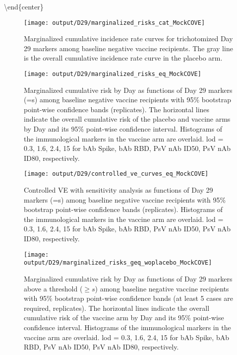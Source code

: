 \documentclass[
]{article}
\begin{document}
\textbackslash end\{center\}

\begin{figure}[H]
    \centering
    \texttt{[image: output/D29/marginalized\_risks\_cat\_MockCOVE]}
    \caption{Marginalized cumulative incidence rate curves for trichotomized Day 29 markers among baseline negative vaccine recipients. The gray line is the overall cumulative incidence rate curve in the placebo arm.}
\end{figure}

\begin{figure}[H]
    \centering
    \texttt{[image: output/D29/marginalized\_risks\_eq\_MockCOVE]}
    \caption{Marginalized cumulative risk by Day \protect as functions of Day 29 markers (=s) among baseline negative vaccine recipients with 95\% bootstrap point-wise confidence bands (\protect replicates). The horizontal lines indicate the overall cumulative risk of the placebo and vaccine arms by Day \protect and its 95\% point-wise confidence interval. Histograms of the immunological markers in the vaccine arm are overlaid. lod = 0.3, 1.6, 2.4, 15 for bAb Spike, bAb RBD, PsV nAb ID50, PsV nAb ID80, respectively.}
    
\end{figure}

\begin{figure}[H]
    \centering
    \texttt{[image: output/D29/controlled\_ve\_curves\_eq\_MockCOVE]}
    \caption{Controlled VE with sensitivity analysis as functions of Day 29 markers (=s) among baseline negative vaccine recipients with 95\% bootstrap point-wise confidence bands (\protect replicates). Histograms of the immunological markers in the vaccine arm are overlaid. lod = 0.3, 1.6, 2.4, 15 for bAb Spike, bAb RBD, PsV nAb ID50, PsV nAb ID80, respectively.}
\end{figure}

\begin{figure}[H]
    \centering
    \texttt{[image: output/D29/marginalized\_risks\_geq\_woplacebo\_MockCOVE]}
    \caption{Marginalized cumulative risk by Day \protect as functions of Day 29 markers above a threshold ($\geq s$) among baseline negative vaccine recipients with 95\% bootstrap point-wise confidence bands (at least 5 cases are required, \protect replicates). The horizontal lines indicate the overall cumulative risk of the vaccine arm by Day \protect and its 95\% point-wise confidence interval. Histograms of the immunological markers in the vaccine arm are overlaid. lod = 0.3, 1.6, 2.4, 15 for bAb Spike, bAb RBD, PsV nAb ID50, PsV nAb ID80, respectively.}
\end{figure}
\end{document}
